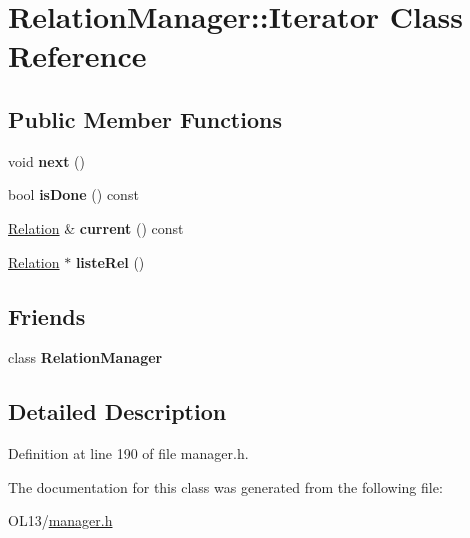 \hypertarget{class_relation_manager_1_1_iterator}{}\section{Relation\+Manager\+:\+:Iterator Class Reference}
\label{class_relation_manager_1_1_iterator}
\subsection*{Public Member Functions}
\begin{DoxyCompactItemize}
\item 
\mbox{\label{class_relation_manager_1_1_iterator_a4deab2fdd2f7b70242ecbfab9d3d1552}} 
void {\bfseries next} ()
\item 
\mbox{\label{class_relation_manager_1_1_iterator_a5e9588417d8c6dc8ce1285612dff7840}} 
bool {\bfseries is\+Done} () const
\item 
\mbox{\label{class_relation_manager_1_1_iterator_ad3f5e514500480f65dc9b14d1aae358f}} 
\hyperlink{class_relation}{Relation} \& {\bfseries current} () const
\item 
\mbox{\label{class_relation_manager_1_1_iterator_a017175bf4f16360c5b2ee5d8fd534d22}} 
\hyperlink{class_relation}{Relation} $\ast$ {\bfseries liste\+Rel} ()
\end{DoxyCompactItemize}
\subsection*{Friends}
\begin{DoxyCompactItemize}
\item 
\mbox{\label{class_relation_manager_1_1_iterator_a55fae9c2e48742dd0a8596e6d8721775}} 
class {\bfseries Relation\+Manager}
\end{DoxyCompactItemize}


\subsection{Detailed Description}


Definition at line 190 of file manager.\+h.



The documentation for this class was generated from the following file\+:\begin{DoxyCompactItemize}
\item 
O\+L13/\hyperlink{manager_8h}{manager.\+h}\end{DoxyCompactItemize}
